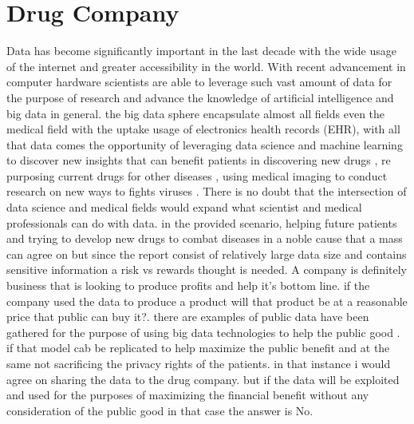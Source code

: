 \documentclass{article}
\begin{document}

\section{Drug Company}  
Data has become significantly important in the last decade with the wide usage of the internet and greater accessibility in the world. With recent advancement in computer hardware scientists are able to leverage such vast amount of data for the purpose of research and advance the knowledge of artificial intelligence and big data in general. the big data sphere encapsulate almost all fields even the medical field with the uptake usage of electronics health records (EHR), with all that data comes the opportunity of leveraging data science and machine learning to discover new insights that can benefit patients in discovering new drugs \cite{Popova2018}, re purposing current drugs for other diseases \cite{Feinberg2018} , using  medical imaging to conduct research on new ways to fights viruses \cite{Yao2020}. There is no doubt that the intersection of data science and medical fields would expand what scientist and medical professionals can do with data. in the provided scenario, helping future patients and trying to develop new drugs to combat diseases in a noble cause that a mass can  agree on but since the report consist of relatively large data size and contains sensitive information a risk vs rewards thought is needed. A company is definitely business that is looking to produce profits and help it's bottom line. if the company used the data to produce a product will that product be at a reasonable price that public can buy it?. there are examples of public data have been gathered for the purpose of using big data technologies to help the public good \cite{Harris2015} \cite{Parker2015}. if that model cab be replicated to help maximize the public benefit and at the same not sacrificing the privacy rights of the patients. in that instance i would agree on sharing the data to the drug company. but if the data will be exploited and used for the purposes of maximizing the financial benefit without any consideration of the public good in that case the answer is No. 




\newpage
 

\end{document}
